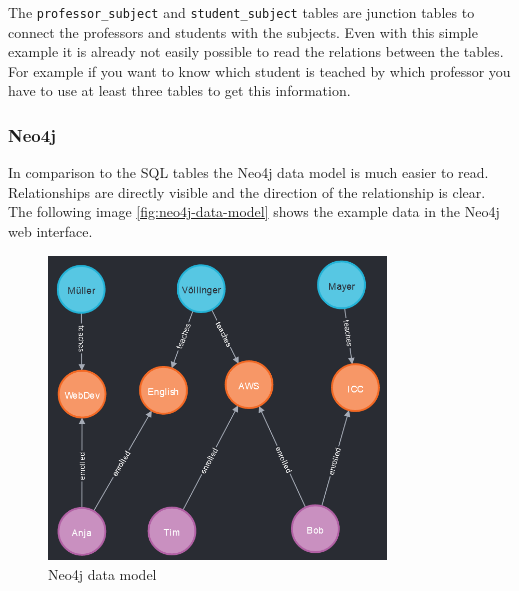 The \texttt{professor\_subject} and \texttt{student\_subject} tables are
junction tables to connect the professors and students with the subjects. Even
with this simple example it is already not easily possible to read the relations
between the tables. For example if you want to know which student is teached by
which professor you have to use at least three tables to get this information.

\subsubsection{Neo4j}
In comparison to the SQL tables the Neo4j data model is much easier to read.
Relationships are directly visible and the direction of the relationship is
clear. The following image \autoref{fig:neo4j-data-model} shows the
example data in the Neo4j web interface.

\begin{figure}[ht]
    \centering
    \includegraphics[width=0.8\textwidth]{images/neo4j-data-model.png}
    \caption{Neo4j data model}
    \label{fig:neo4j-data-model}
\end{figure}